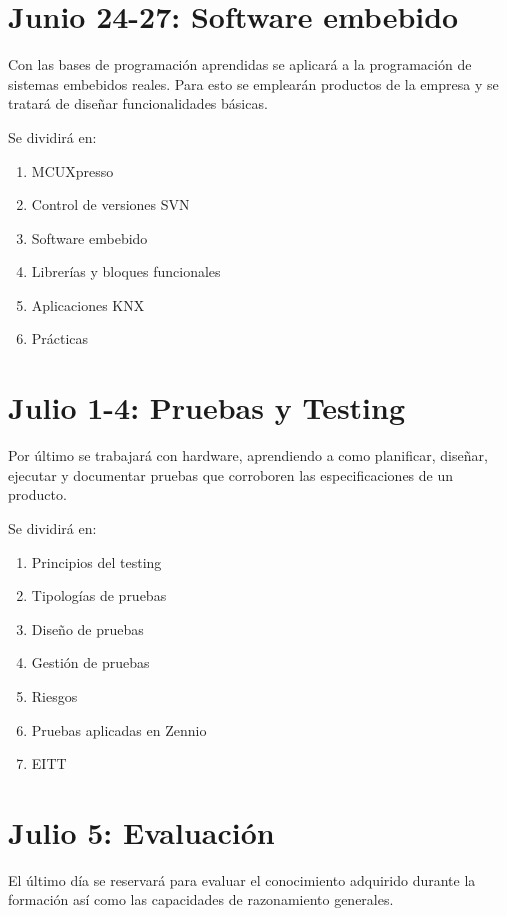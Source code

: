 \section*{Junio 24-27: Software embebido}
\label{sec:jun24-27}

Con las bases de programación aprendidas se aplicará a la programación de sistemas embebidos reales. Para esto se emplearán productos de la empresa y se tratará de diseñar funcionalidades básicas.

Se dividirá en:

\begin{enumerate}
    \item MCUXpresso
    \item Control de versiones SVN
    \item Software embebido
    \item Librerías y bloques funcionales
    \item Aplicaciones KNX
    \item Prácticas
\end{enumerate}

\section*{Julio 1-4: Pruebas y Testing}
\label{sec:jul1-4}

Por último se trabajará con hardware, aprendiendo a como planificar, diseñar, ejecutar y documentar pruebas que corroboren las especificaciones de un producto.

Se dividirá en:
\begin{enumerate}
    \item Principios del testing
    \item Tipologías de pruebas
    \item Diseño de pruebas
    \item Gestión de pruebas
    \item Riesgos
    \item Pruebas aplicadas en Zennio
    \item EITT
\end{enumerate}

\section*{Julio 5: Evaluación}
\label{sec:jul5}

El último día se reservará para evaluar el conocimiento adquirido durante la formación así como las capacidades de razonamiento generales.

